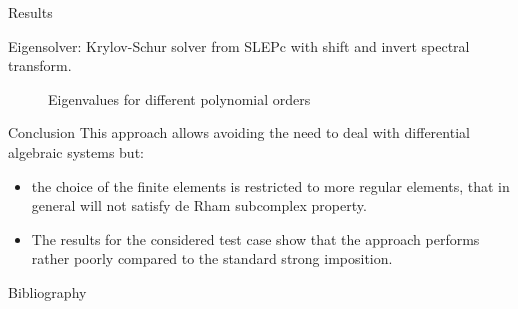 \documentclass[aspectratio=169]{beamer}
\begin{document}
\begin{frame}{Results}
	
	Eigensolver: Krylov-Schur solver from SLEPc with shift and invert spectral transform.
	
	\begin{figure}
		\centering
		\caption*{Eigenvalues for different polynomial orders}%
	\end{figure}
	

\end{frame}

\begin{frame}{Conclusion}
	This approach allows avoiding the need to deal with differential algebraic systems but:
	\begin{itemize}
		\item the choice of the finite elements is restricted to more regular elements, that in general will not satisfy de Rham subcomplex property.
		\item The results for the considered
		test case show that the approach performs rather poorly
		compared to the standard strong imposition.
	\end{itemize}
\end{frame}

\begin{frame}{Bibliography}
	\printbibliography
\end{frame}

	\appendix
	
	
	
	
\end{document}

